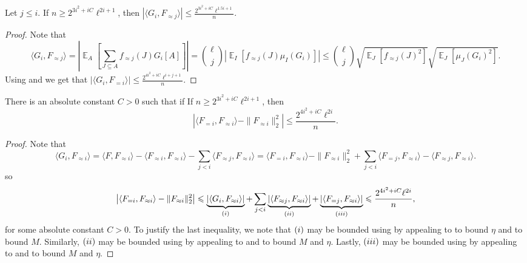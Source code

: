 \documentclass{toc}
\newcommand{\rom}[1]{\uppercase\expandafter{\romannumeral #1\relax}}
\newcommand\card[1]{\left| {#1} \right|}
\newcommand\Expect[2]{{\mathop{\mathbb{E}}_{#1}\left[ {#2} \right]}}
\newcommand\norm[1]{\| #1 \|}
\newcommand\inner[2]{\langle{#1},{#2}\rangle}
\renewcommand\geq{\geqslant}
\renewcommand\leq{\leqslant}
\newcommand\lvlfn[2]{{#1}_{={#2}}}
\newcommand\approxlvlfn[2]{{#1}_{\approx{#2}}}
\begin{document}
\begin{claim}
  Let $j\leq i$. If $n\geq 2^{3i^2+iC} \ell^{2i+1}$, then $\card{\inner{G_i}{\approxlvlfn{F}{j}}}\leq \frac{2^{3i^2+iC} \ell^{1.5i + 1}}{n}$.
\end{claim}
\begin{proof}
Note that
\[
\inner{G_i}{\approxlvlfn{F}{j}}
=\card{\Expect{A}{\sum\limits_{J\subseteq A} \approxlvlfn{f}{j}(J) G_i[A]}}
={\ell \choose j}\card{\Expect{I}{\approxlvlfn{f}{j}(J) \mu_I(G_i)}}
\leq
{\ell \choose j}\sqrt{\Expect{J}{\approxlvlfn{f}{j}(J)^2}}
\sqrt{\Expect{J}{\mu_J(G_i)^2}}.
\]
Using  and  we get that
$\card{\inner{G_i}{\lvlfn{F}{i}}}\leq \frac{2^{4i^2+iC} \ell^{i+j+1}}{n}$.
\end{proof}
\begin{claim}\label{claim:apx2}
  There is an absolute constant $C>0$ such that if
  If $n\geq 2^{3i^2+iC} \ell^{2i+1}$, then
  \[
  \card{\inner{\lvlfn{F}{i}}{\approxlvlfn{F}{i}}
-\norm{\approxlvlfn{F}{i}}_2^2}\leq \frac{2^{4i^2+iC} \ell^{2i}}{n}.
\]
\end{claim}
\begin{proof}
Note that
\[
\inner{G_i}{\approxlvlfn{F}{i}}
=\inner{F}{\approxlvlfn{F}{i}}
-\inner{\approxlvlfn{F}{i}}{\approxlvlfn{F}{i}}
-\sum\limits_{j<i}\inner{\approxlvlfn{F}{j}}{\approxlvlfn{F}{i}}
=\inner{\lvlfn{F}{i}}{\approxlvlfn{F}{i}}-\norm{\approxlvlfn{F}{i}}_2^2
+\sum\limits_{j<i}\inner{\lvlfn{F}{j}}{\approxlvlfn{F}{i}}-\inner{\approxlvlfn{F}{j}}{\approxlvlfn{F}{i}}.
\]
so
\[
\card{\inner{\lvlfn{F}{i}}{\approxlvlfn{F}{i}}
-\norm{\approxlvlfn{F}{i}}_2^2}
\leq
\underbrace{\card{\inner{G_i}{\approxlvlfn{F}{i}}}}_{(\rom{1})}
+\sum\limits_{j<i}\underbrace{\card{\inner{\approxlvlfn{F}{j}}{\approxlvlfn{F}{i}}}}_{(\rom{2})}+\underbrace{\card{\inner{\lvlfn{F}{j}}{\approxlvlfn{F}{i}}}}_{(\rom{3})}
\leq \frac{2^{4i^2+iC} \ell^{2i}}{n},
\]
for some absolute constant $C>0$. To justify the last inequality, we note that $(\rom{1})$ may be bounded using 
by appealing to  to bound $\eta$ and  to bound $M$. Similarly, $(\rom{2})$ may be bounded using
 by appealing to  and 
to bound $M$ and $\eta$. Lastly, $(\rom{3})$ may be bounded using
 by appealing to  and 
to bound $M$ and $\eta$.
\end{proof}
\end{document}
